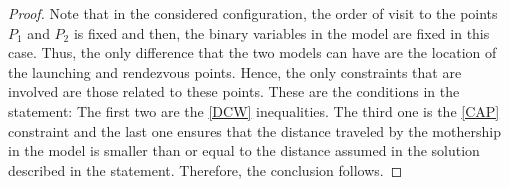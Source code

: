{\begin{proof}
Note that in the considered configuration, the order of visit to the points $P_1$ and $P_2$ is fixed and then, the binary variables in the model are fixed in this case. Thus, the only difference that the two models can have are the location of the launching and rendezvous points. Hence, the only constraints that are involved are those related to these points. These are the conditions in the statement: The first two are the \eqref{DCW} inequalities. The third one is the \eqref{CAP} constraint and the last one ensures that the distance traveled by the mothership in the  model is smaller than or equal to the distance assumed in the  solution described in the statement. Therefore, the conclusion follows.
\end{proof}

\noindent
{}

}
\color{black}


